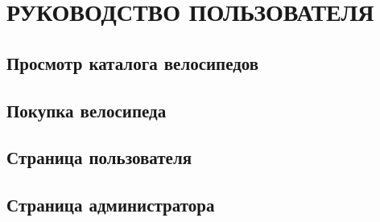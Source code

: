 \section[Руководство пользователя]{РУКОВОДСТВО ПОЛЬЗОВАТЕЛЯ}

\subsection{Просмотр каталога велосипедов}

\subsection{Покупка велосипеда}

\subsection{Страница пользователя}

\subsection{Страница администратора}

\pagebreak
